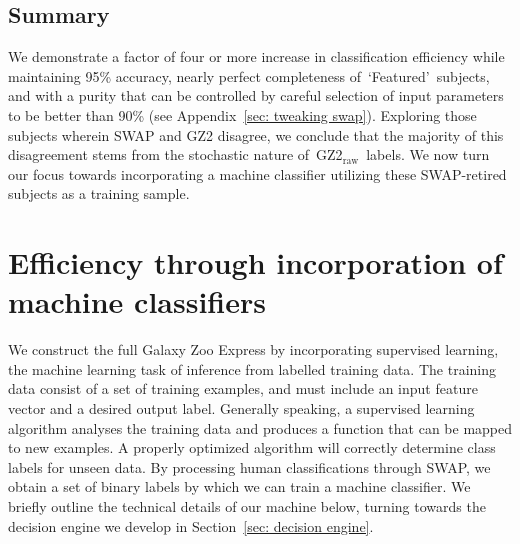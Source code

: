 \documentclass[twocolumn,  trackchanges,]{aastex6}%
\newcommand{\feat}{`Featured'}
\newcommand{\raw}{GZ2$_{\text{raw}}$}
\begin{document}
\subsection{Summary}



We demonstrate a factor of four or more increase in 
classification efficiency while maintaining 95\% accuracy, nearly perfect 
completeness of~\feat~subjects, and with a purity that can be controlled by careful 
selection of input parameters to be better than 90\% (see Appendix~\ref{sec: tweaking swap}).
Exploring those subjects wherein SWAP and GZ2 disagree, we conclude that 
the majority of this disagreement stems from the stochastic nature of~\raw~labels.
We now turn our focus towards incorporating a machine
classifier utilizing these SWAP-retired subjects as a training sample. 


\section{Efficiency through incorporation of machine classifiers} \label{sec: machine}

We construct the full Galaxy Zoo Express by incorporating supervised 
learning, the machine learning task of inference from labelled training data. 
The training data consist of a set of training examples, and must include
an input feature vector and a desired output label.  Generally speaking,
a supervised learning algorithm analyses the training data and produces a 
function that can be mapped to new examples. A properly optimized algorithm will 
correctly determine class labels for unseen data. By processing human classifications 
through SWAP, we obtain a set of binary labels by which we can train a machine 
classifier. We briefly outline the technical details of our machine below,  turning
towards the decision engine we develop in Section~\ref{sec: decision engine}. 
\end{document}
